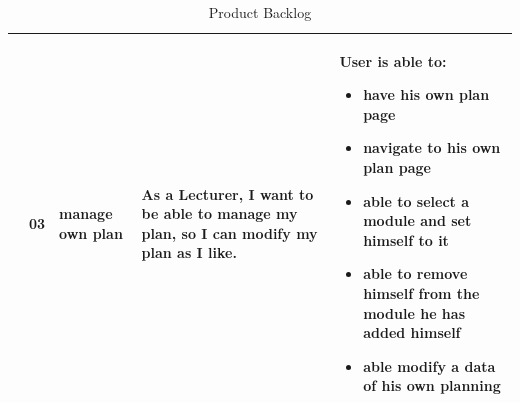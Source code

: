 \documentclass{scrartcl}
\begin{document}
\begin{table}[H]
\begin{center}
\begin{tabular}{|p{4cm}|p{0.5cm} |p{3cm}|p{4cm}|p{4cm}|}
&
03&
manage own plan&

As a Lecturer, I want to be able to manage my plan, so I can modify my plan as I like. &

 User is able to:            
\begin{itemize}
\item have his own plan page
\item navigate to his own plan page
\item able to select a module and set himself to it
\item able to remove himself from the module he has added himself
\item able modify a data of his own planning 
\end{itemize}                                                                 \\ \hline







  \end{tabular}
\end{center}
\caption{Product Backlog}
\label{table2}
\end{table}

\pagebreak
\end{document}
